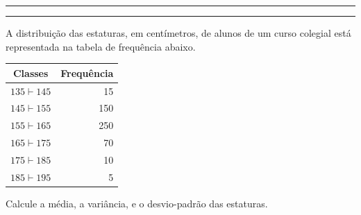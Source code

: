 \documentclass[a4paper,11pt,fleqn]{article}\usepackage[]{graphicx}\usepackage[]{color}
\theoremstyle{definition}
\begin{document}
\vspace{0.3cm}
\hrule
\vspace{0.3cm}

\clearpage

\vspace{0.3cm}
\hrule
\vspace{0.3cm}

\begin{compactenum}[6.] %
\item A distribuição das estaturas, em centímetros, de alunos de um
  curso colegial está representada na tabela de frequência abaixo.
  \begin{table}[h]
    \centering
    \begin{tabular}{cr}
      \hline
      \textbf{Classes} & \textbf{Frequência} \\
      \hline
      $135 \vdash 145$ & 15 \\
      $145 \vdash 155$ & 150 \\
      $155 \vdash 165$ & 250 \\
      $165 \vdash 175$ & 70 \\
      $175 \vdash 185$ & 10 \\
      $185 \vdash 195$ & 5 \\
      \hline
    \end{tabular}
  \end{table}
  Calcule a média, a variância, e o desvio-padrão das estaturas.




\end{compactenum}
\end{document}
